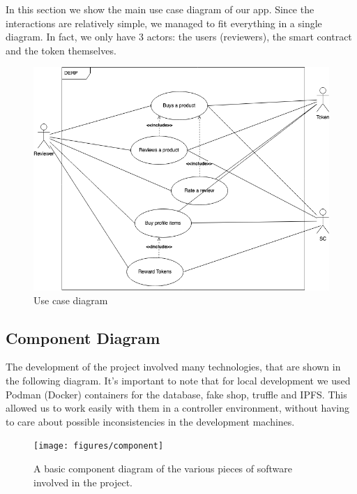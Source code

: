 \documentclass[12pt,a4paper,oneside]{article}
\theoremstyle{definition}
\begin{document}

In this section we show the main use case diagram of our app. Since the interactions are relatively simple, we managed to fit everything in a single diagram. In fact, we only have 3 actors: the users (reviewers), the smart contract and the token themselves.

\begin{figure}[ht]
	\centering
	\includegraphics[scale=0.5]{figures/uc_drawio.png}
	\caption{Use case diagram}
	\label{fig:use_case}
\end{figure}


\subsection{Component Diagram}

The development of the project involved many technologies, that are shown in the following diagram.
It's important to note that for local development we used Podman (Docker) containers for the database, fake shop, truffle and IPFS. This allowed us to work easily with them in a controller environment, without having to care about possible inconsistencies in the development machines.

\begin{figure}[H]
	\centering
	\texttt{[image: figures/component]}
	\caption{A basic component diagram of the various pieces of software involved in the project.}
	\label{fig:component}
\end{figure}
\end{document}
